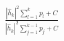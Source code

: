 \documentclass[preview]{standalone}
\begin{document}
\begin{align*}
\frac{\left|{\hat{h}_k}\right|^2\sum_{l=1}^{k}p_l+ C}{\left|{\hat{h}_k}\right|^2\sum_{j=1}^{k-1}p_j+ C}
\end{align*}
\end{document}
